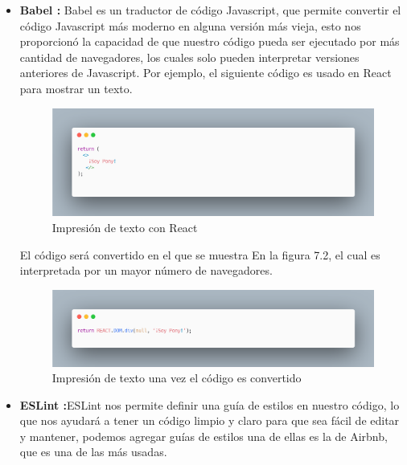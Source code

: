 \begin{itemize}
       \item \textbf{Babel  :}   Babel es un traductor de código Javascript, que permite convertir el código Javascript más moderno en alguna versión más vieja, esto nos proporcionó la capacidad de que nuestro código pueda ser ejecutado por más cantidad de navegadores, los cuales solo pueden interpretar versiones anteriores de Javascript. Por ejemplo, el siguiente código es usado en React para mostrar un texto. 
    \begin{figure}[H]
    \includegraphics[width=1\textwidth]{./Imagenes/image16.png}
    \caption[Impresión de texto con React]{Impresión de texto con React}
    \end{figure}
       El código será convertido en el que se muestra En la figura 7.2, el cual es interpretada por un mayor número de navegadores. 
       \newline
       \newline
       \begin{figure}[H]
       \includegraphics[width=1\textwidth]{./Imagenes/image5.png}
        \caption[Impresión de texto una vez el código es convertido]{Impresión de texto una vez el código es convertido}
       \end{figure}
       \newline
       \newline
       \item \textbf{ESLint :}ESLint nos permite definir una guía de estilos en nuestro código, lo que nos ayudará a tener un código limpio y claro para que sea fácil de editar y mantener, podemos agregar guías de estilos una de ellas es la de Airbnb, que es una de las más usadas. 
       
    \end{itemize}